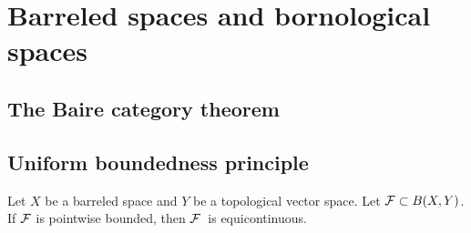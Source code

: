 \documentclass{../crs}
\begin{document}
\section{Barreled spaces and bornological spaces}

\subsection{The Baire category theorem}

\subsection{Uniform boundedness principle}
\begin{thm}
Let $X$ be a barreled space and $Y$ be a topological vector space.
Let $\mathcal{F}\subset B(X,Y)$.
If $\mathcal{F}$ is pointwise bounded, then $\mathcal{F}$\ is equicontinuous.
\end{thm}
\end{document}

